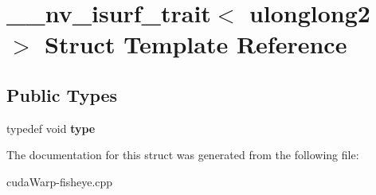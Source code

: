 \hypertarget{struct____nv__isurf__trait_3_01ulonglong2_01_4}{}\section{\+\_\+\+\_\+nv\+\_\+isurf\+\_\+trait$<$ ulonglong2 $>$ Struct Template Reference}
\label{struct____nv__isurf__trait_3_01ulonglong2_01_4}
\subsection*{Public Types}
\begin{DoxyCompactItemize}
\item 
typedef void {\bfseries type}\hypertarget{struct____nv__isurf__trait_3_01ulonglong2_01_4_a25bd2013951cdcf68c99d2694edd2aaa}{}\label{struct____nv__isurf__trait_3_01ulonglong2_01_4_a25bd2013951cdcf68c99d2694edd2aaa}

\end{DoxyCompactItemize}


The documentation for this struct was generated from the following file\+:\begin{DoxyCompactItemize}
\item 
cuda\+Warp-\/fisheye.\+cpp\end{DoxyCompactItemize}
